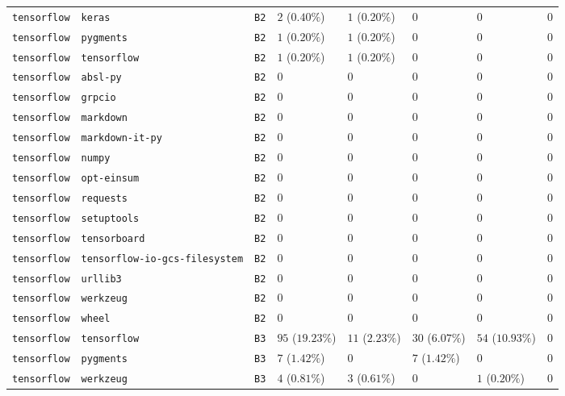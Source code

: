 \begin{table}
\begin{tabular}{llllllll}
\texttt{tensorflow} & \texttt{keras} & \texttt{B2} & $2$ ($0.40\%$) & $1$ ($0.20\%$) & $0$ & $0$ & $0$ \\
\texttt{tensorflow} & \texttt{pygments} & \texttt{B2} & $1$ ($0.20\%$) & $1$ ($0.20\%$) & $0$ & $0$ & $0$ \\
\texttt{tensorflow} & \texttt{tensorflow} & \texttt{B2} & $1$ ($0.20\%$) & $1$ ($0.20\%$) & $0$ & $0$ & $0$ \\
\texttt{tensorflow} & \texttt{absl-py} & \texttt{B2} & $0$ & $0$ & $0$ & $0$ & $0$ \\
\texttt{tensorflow} & \texttt{grpcio} & \texttt{B2} & $0$ & $0$ & $0$ & $0$ & $0$ \\
\texttt{tensorflow} & \texttt{markdown} & \texttt{B2} & $0$ & $0$ & $0$ & $0$ & $0$ \\
\texttt{tensorflow} & \texttt{markdown-it-py} & \texttt{B2} & $0$ & $0$ & $0$ & $0$ & $0$ \\
\texttt{tensorflow} & \texttt{numpy} & \texttt{B2} & $0$ & $0$ & $0$ & $0$ & $0$ \\
\texttt{tensorflow} & \texttt{opt-einsum} & \texttt{B2} & $0$ & $0$ & $0$ & $0$ & $0$ \\
\texttt{tensorflow} & \texttt{requests} & \texttt{B2} & $0$ & $0$ & $0$ & $0$ & $0$ \\
\texttt{tensorflow} & \texttt{setuptools} & \texttt{B2} & $0$ & $0$ & $0$ & $0$ & $0$ \\
\texttt{tensorflow} & \texttt{tensorboard} & \texttt{B2} & $0$ & $0$ & $0$ & $0$ & $0$ \\
\texttt{tensorflow} & \texttt{tensorflow-io-gcs-filesystem} & \texttt{B2} & $0$ & $0$ & $0$ & $0$ & $0$ \\
\texttt{tensorflow} & \texttt{urllib3} & \texttt{B2} & $0$ & $0$ & $0$ & $0$ & $0$ \\
\texttt{tensorflow} & \texttt{werkzeug} & \texttt{B2} & $0$ & $0$ & $0$ & $0$ & $0$ \\
\texttt{tensorflow} & \texttt{wheel} & \texttt{B2} & $0$ & $0$ & $0$ & $0$ & $0$ \\
\texttt{tensorflow} & \texttt{tensorflow} & \texttt{B3} & $95$ ($19.23\%$) & $11$ ($2.23\%$) & $30$ ($6.07\%$) & $54$ ($10.93\%$) & $0$ \\
\texttt{tensorflow} & \texttt{pygments} & \texttt{B3} & $7$ ($1.42\%$) & $0$ & $7$ ($1.42\%$) & $0$ & $0$ \\
\texttt{tensorflow} & \texttt{werkzeug} & \texttt{B3} & $4$ ($0.81\%$) & $3$ ($0.61\%$) & $0$ & $1$ ($0.20\%$) & $0$ \\

\end{tabular}
\end{table}
